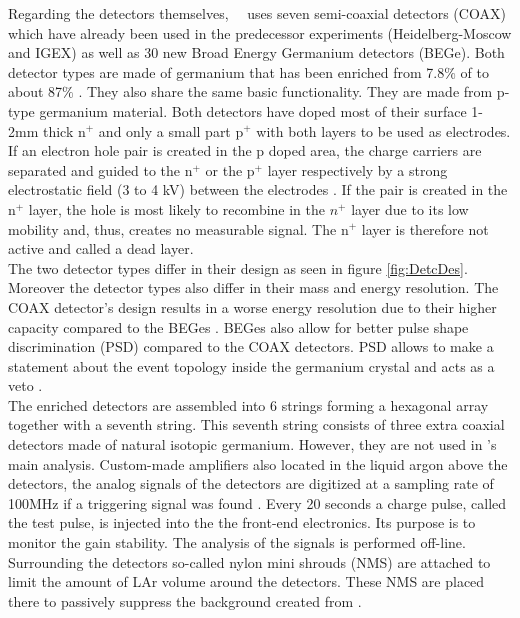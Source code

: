 \documentclass[encoding=utf8,british]{tumphthesis}
\begin{document}
Regarding the detectors themselves, \gerda\ \PII\ uses seven semi-coaxial detectors (COAX) which have already been used in the predecessor experiments (Heidelberg-Moscow and IGEX) as well as 30 new Broad Energy Germanium detectors (BEGe).
Both detector types are made of germanium that has been enriched from 7.8$\%$ of  to about 87$\%$ \cite{agostini_background_2017}.
They also share the same basic functionality.
They are made from p-type germanium material.
Both detectors have doped most of their surface 1-2mm thick n$^+$ and only a small part p$^+$ with both layers to be used as electrodes.
If an electron hole pair is created in the p doped area, the charge carriers are separated and guided to the n$^+$ or the p$^+$ layer respectively by a strong electrostatic field (3 to 4 kV) between the electrodes \cite{spieler_semiconductor_2005}.
If the pair is created in the n$^+$ layer, the hole is most likely to recombine in the $n^+$ layer due to its low mobility and, thus, creates no measurable signal.
The n$^+$ layer is therefore not active and called a dead layer.
\\

The two detector types differ in their design as seen in figure \ref{fig:DetcDes}.
Moreover the detector types also differ in their mass and energy resolution.
The COAX detector's design results in a worse energy resolution due to their higher capacity compared to the BEGes \cite{agostini_production_2015}.
BEGes also allow for better pulse shape discrimination (PSD) compared to the COAX detectors.
PSD allows to make a statement about the event topology inside the germanium crystal and acts as a veto \cite{agostini_pulse_2013}.
\\

The enriched detectors are assembled into 6 strings forming a hexagonal array together with a seventh string.
This seventh string consists of three extra coaxial detectors made of natural isotopic germanium.
However, they are not used in \gerda's main analysis.
Custom-made amplifiers also located in the liquid argon above the detectors, the analog signals of the detectors are digitized at a sampling rate of 100MHz if a triggering signal was found \cite{riboldi_cryogenic_2015}.
Every 20 seconds a charge pulse, called the test pulse, is injected into the the front-end electronics.
Its purpose is to monitor the gain stability.
The analysis of the signals is performed off-line.
Surrounding the detectors so-called nylon mini shrouds (NMS) are attached to limit the amount of LAr volume around the detectors.
These NMS are placed there to passively suppress the background created from  \cite{agostini_background_2014}.
\end{document}
